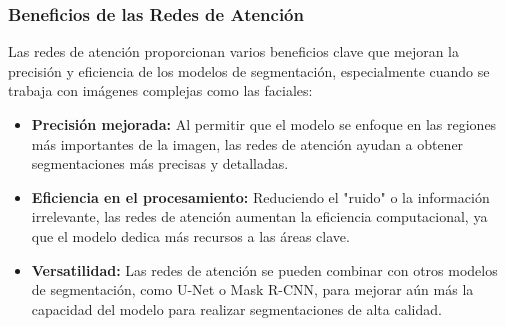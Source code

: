 \subsubsection{Beneficios de las Redes de Atención}  
Las redes de atención proporcionan varios beneficios clave que mejoran la precisión y eficiencia de los modelos de segmentación, especialmente cuando se trabaja con imágenes complejas como las faciales:
\begin{itemize}
    \item \textbf{Precisión mejorada:} Al permitir que el modelo se enfoque en las regiones más importantes de la imagen, las redes de atención ayudan a obtener segmentaciones más precisas y detalladas.
    \item \textbf{Eficiencia en el procesamiento:} Reduciendo el "ruido" o la información irrelevante, las redes de atención aumentan la eficiencia computacional, ya que el modelo dedica más recursos a las áreas clave.
    \item \textbf{Versatilidad:} Las redes de atención se pueden combinar con otros modelos de segmentación, como U-Net o Mask R-CNN, para mejorar aún más la capacidad del modelo para realizar segmentaciones de alta calidad. \parencite{autor2021beneficios}
\end{itemize}

